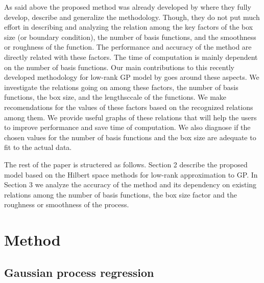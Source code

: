 \documentclass[]{interact}
\theoremstyle{plain}%
\theoremstyle{definition}
\theoremstyle{remark}
\begin{document}
As said above the proposed method was already developed by \cite{solin2018hilbert} where they fully develop, describe and generalize the methodology. Though, they do not put much effort in describing and analyzing the relation among the key factors of the box size (or boundary condition), the number of basis functions, and the smoothness or roughness of the function. The performance and accuracy of the method are directly related with these factors. The time of computation is mainly dependent on the number of basis functions. Our main contributions to this recently developed methodology for low-rank GP model by \cite{solin2018hilbert} goes around these aspects. We investigate the relations going on among these factors, the number of basis functions, the box size, and the lengthsccale of the functions.  We make recomendations for the values of these factors based on the recognized relations among them. We provide useful graphs of these relations that will help the users to improve performance and save time of computation. We also diagnose if the chosen values for the number of basis functions and the box size are adequate to fit to the actual data.

The rest of the paper is structered as follows. Section 2 describe  the proposed model based on the Hilbert space methods for low-rank approximation to GP. In Section 3 we analyze the accuracy of the method and its dependency on existing relations among the number of basis functions, the box size factor and the roughness or smoothness of the process.

\vspace{3mm}
\section{Method}\label{sec:bf_method}

\subsection{Gaussian process regression}
\end{document}
